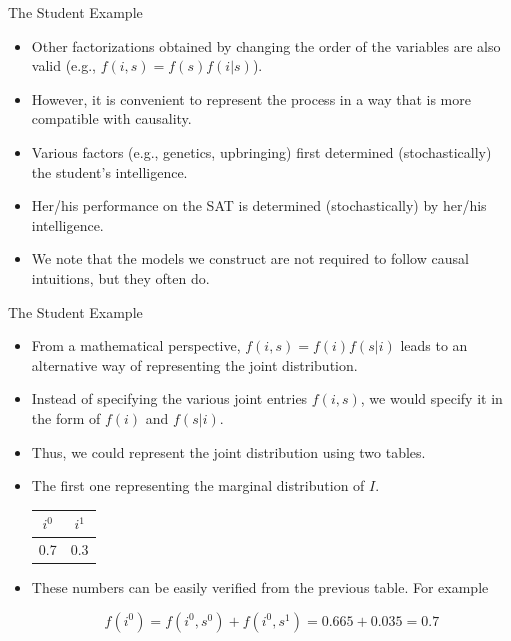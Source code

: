 \documentclass[handout]{beamer}
\begin{document}
\begin{frame}{The Student Example}
\scriptsize{
\begin{itemize}

\item Other factorizations obtained by changing the order of the variables are also valid (e.g., $f(i,s) = f(s)f(i|s)$).


\item However, it is convenient to represent the process in a way that is more compatible with causality.

\item Various factors (e.g., genetics, upbringing) first determined (stochastically) the student's intelligence.
\item Her/his performance on the SAT is determined (stochastically) by her/his  intelligence. 
\item We note that the models we construct are not required to follow causal intuitions, but they often do.



\end{itemize}



} 

\end{frame}


\begin{frame}{The Student Example}
\scriptsize{
\begin{itemize}

\item From a mathematical perspective, $ f(i,s) = f(i)f(s|i)$ leads to an alternative way of representing the joint distribution. 

\item Instead of specifying the various joint entries $f(i,s)$, we would specify it in the form of $f(i)$ and $f(s|i)$. 
\item Thus, we could represent the joint distribution using two tables.

\item The first one representing the marginal distribution of $I$.


\begin{table}
\centering
  \begin{tabular}{cc} \hline
$i^0$ & $i^1$  \\ \hline
0.7 & 0.3   
\end{tabular} 
\end{table}

\item These numbers can be easily verified from the previous table. For example 

\begin{displaymath}
f(i^{0})=f(i^{0},s^0)+f(i^{0},s^1)=0.665+0.035=0.7 
\end{displaymath}




\end{itemize}



} 

\end{frame}
\end{document}
